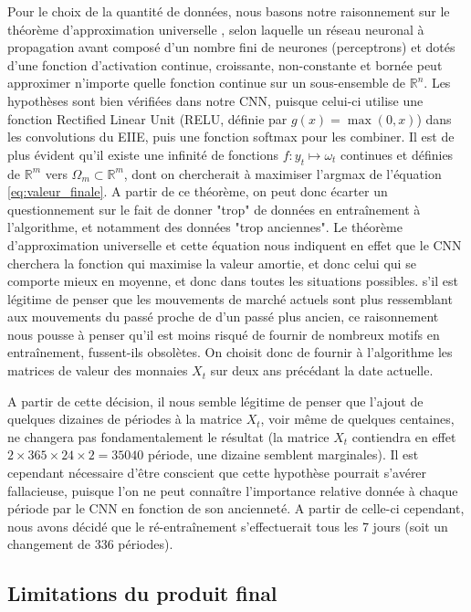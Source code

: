 \documentclass[a4paper, 10pt]{article}
\begin{document}
Pour le choix de la quantité de données, nous basons notre raisonnement sur le théorème d'approximation universelle \cite{Hornik1991}, selon laquelle un réseau neuronal à propagation avant composé d'un nombre fini de neurones (perceptrons) et dotés d'une fonction d'activation continue, croissante, non-constante et bornée peut approximer n'importe quelle fonction continue sur un sous-ensemble de $\mathbb{R}^n$. Les hypothèses sont bien vérifiées dans notre CNN, puisque celui-ci utilise une fonction Rectified Linear Unit (RELU, définie par $g(x) = \max(0, x)$) dans les convolutions du EIIE, puis une fonction softmax pour les combiner. Il est de plus évident qu'il existe une infinité de fonctions $f \colon y_t \mapsto \omega_t$ continues et définies de $\mathbb{R}^m$ vers $\Omega_m \subset \mathbb{R}^m$, dont on chercherait à maximiser l'argmax de l'équation \eqref{eq:valeur_finale}. A partir de ce théorème, on peut donc écarter un questionnement sur le fait de donner "trop" de données en entraînement à l'algorithme, et notamment des données "trop anciennes". Le théorème d'approximation universelle et cette équation nous indiquent en effet que le CNN cherchera la fonction qui maximise la valeur amortie, et donc celui qui se comporte mieux en moyenne, et donc dans toutes les situations possibles. s'il est légitime de penser que les mouvements de marché actuels sont plus ressemblant aux mouvements du passé proche de d'un passé plus ancien, ce raisonnement nous pousse à penser qu'il est moins risqué de fournir de nombreux motifs en entraînement, fussent-ils obsolètes. On choisit donc de fournir à l'algorithme les matrices de valeur des monnaies $X_t$ sur deux ans précédant la date actuelle.

A partir de cette décision, il nous semble légitime de penser que l'ajout de quelques dizaines de périodes à la matrice $X_t$, voir même de quelques centaines, ne changera pas fondamentalement le résultat (la matrice $X_t$ contiendra en effet $2 \times 365 \times 24 \times 2 = 35 040$ période, une dizaine semblent marginales). Il est cependant nécessaire d'être conscient que cette hypothèse pourrait s'avérer fallacieuse, puisque l'on ne peut connaître l'importance relative donnée à chaque période par le CNN en fonction de son ancienneté. A partir de celle-ci cependant, nous avons décidé que le ré-entraînement s'effectuerait tous les 7 jours (soit un changement de $336$ périodes).

\subsection{Limitations du produit final}
\label{sec:developpement_limites}
\end{document}
